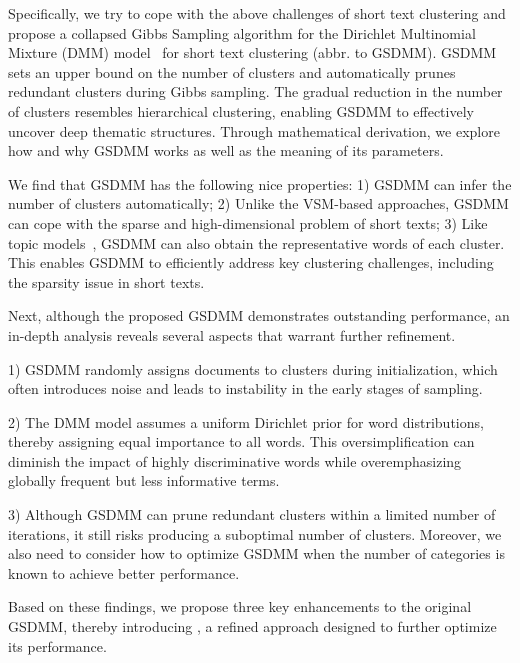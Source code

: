 Specifically, we try to cope with the above challenges of short text clustering and propose a collapsed Gibbs Sampling algorithm for the Dirichlet Multinomial Mixture (DMM) model~\cite{nigam2000text} for short text clustering (abbr. to GSDMM). GSDMM sets an upper bound on the number of clusters and automatically prunes redundant clusters during Gibbs sampling. The gradual reduction in the number of clusters resembles hierarchical clustering, enabling GSDMM to effectively uncover deep thematic structures. Through mathematical derivation, we explore how and why GSDMM works as well as the meaning of its parameters.

We find that GSDMM has the following nice properties: 1) GSDMM can infer the number of clusters automatically; 
2) Unlike the VSM-based approaches, GSDMM can cope with the sparse and high-dimensional problem of short texts; 3) Like topic models~\cite{Blei:LDA2003}, GSDMM can also obtain the representative words of each cluster. This enables GSDMM to efficiently address key clustering challenges, including the sparsity issue in short texts.

Next, although the proposed GSDMM demonstrates outstanding performance\cite{GSDMM}, an in-depth analysis reveals several aspects that warrant further refinement.

1) GSDMM randomly assigns documents to clusters during initialization, which often introduces noise and leads to instability in the early stages of sampling. 

2) The DMM model assumes a uniform Dirichlet prior for word distributions, thereby assigning equal importance to all words. This oversimplification can diminish the impact of highly discriminative words while overemphasizing globally frequent but less informative terms. 

3) Although GSDMM can prune redundant clusters within a limited number of iterations, it still risks producing a suboptimal number of clusters. Moreover, we also need to consider how to optimize GSDMM when the number of categories is known to achieve better performance. 

Based on these findings, we propose three key enhancements to the original GSDMM, thereby introducing \sysname{}, a refined approach designed to further optimize its performance.

